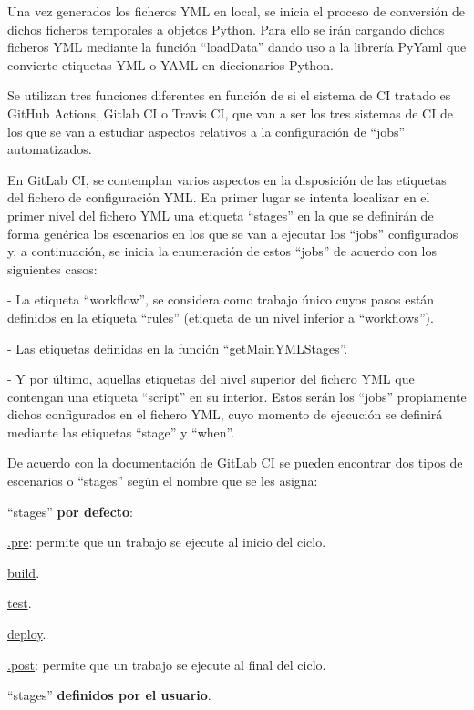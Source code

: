 Una vez generados los ficheros YML en local, se inicia el proceso de conversión de dichos ficheros temporales a objetos Python. Para ello se irán cargando dichos ficheros YML mediante la función ``loadData'' dando uso a la librería PyYaml que convierte etiquetas YML o YAML en diccionarios Python. 

Se utilizan tres funciones diferentes en función de si el sistema de CI tratado es GitHub Actions, Gitlab CI o Travis CI, que van a ser los tres sistemas de CI de los que se van a estudiar aspectos relativos a la configuración de ``jobs'' automatizados.

En GitLab CI, se contemplan varios aspectos en la disposición de las etiquetas del fichero de configuración YML. En primer lugar  se intenta localizar en el primer nivel del fichero YML una etiqueta ``stages'' en la que se definirán de forma genérica los escenarios en los que se van a ejecutar los ``jobs'' configurados y, a continuación, se inicia la enumeración de estos ``jobs'' de acuerdo con los siguientes casos:

- La etiqueta ``workflow'', se considera como trabajo único cuyos pasos están definidos en la etiqueta ``rules'' (etiqueta de un nivel inferior a ``workflows'').

- Las etiquetas definidas en la función ``getMainYMLStages''.

- Y por último, aquellas etiquetas del nivel superior del fichero YML que contengan una etiqueta ``script'' en su interior. Estos serán los ``jobs'' propiamente dichos configurados en el fichero YML, cuyo momento de ejecución se definirá mediante las etiquetas ``stage'' y ``when''.

De acuerdo con la documentación de GitLab CI \cite{stagesGitLabCI} se pueden encontrar dos tipos de escenarios o ``stages'' según el nombre que se les asigna:

\begin{compactitem}
    \item ``stages'' \textbf{por defecto}:
    
    \begin{compactitem}
        \item \underline{.pre}: permite que un trabajo se ejecute al inicio del ciclo.
        \item \underline{build}.
        \item \underline{test}.
        \item \underline{deploy}.
        \item \underline{.post}: permite que un trabajo se ejecute al final del ciclo.
    \end{compactitem}
    
    \item ``stages'' \textbf{definidos por el usuario}.
\end{compactitem}


